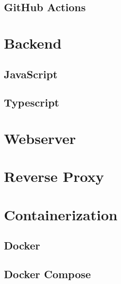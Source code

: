 \subsection{GitHub Actions}

\section{Backend}
\subsection{JavaScript}
\subsection{Typescript}

\section{Webserver}

\section{Reverse Proxy}

\section{Containerization}
\subsection{Docker}
\subsection{Docker Compose}